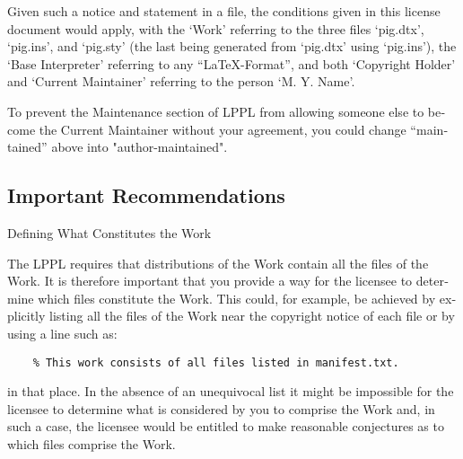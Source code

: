 \begin{otherlanguage}{english}
Given such a notice and statement in a file, the conditions given in
this license document would apply, with the `Work' referring to the
three files `pig.dtx', `pig.ins', and `pig.sty' (the last being
generated from `pig.dtx' using `pig.ins'), the `Base Interpreter'
referring to any ``\LaTeX-Format'', and both `Copyright Holder' and
`Current Maintainer' referring to the person `M. Y. Name'.

To prevent the Maintenance section of LPPL from allowing someone else
to become the Current Maintainer without your agreement, you could
change ``maintained'' above into "author-maintained".


\subsection{Important Recommendations}

 Defining What Constitutes the Work

   The LPPL requires that distributions of the Work contain all the
   files of the Work.  It is therefore important that you provide a
   way for the licensee to determine which files constitute the Work.
   This could, for example, be achieved by explicitly listing all the
   files of the Work near the copyright notice of each file or by
   using a line such as:
\begin{verbatim}
    % This work consists of all files listed in manifest.txt.
\end{verbatim}
%
   in that place.  In the absence of an unequivocal list it might be
   impossible for the licensee to determine what is considered by you
   to comprise the Work and, in such a case, the licensee would be
   entitled to make reasonable conjectures as to which files comprise
   the Work.

\end{otherlanguage}
